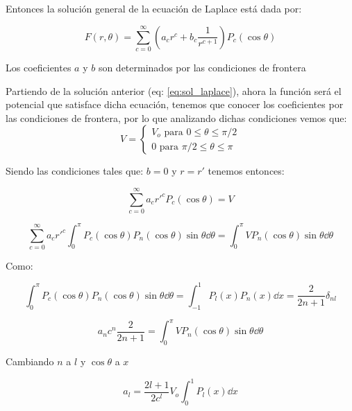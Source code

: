 \documentclass[11pt]{report}
\theoremstyle{plain}
\theoremstyle{definition}
\begin{document}
Entonces la solución general de la ecuación de Laplace está dada por:

\begin{equation}
	\label{eq:sol_laplace}
	F(r,\theta)=\sum^\infty_{c=0}\left(a_c r^c + b_c \frac{1}{r^{c+1}}\right)P_c(\cos\theta)
\end{equation}

Los coeficientes $a$ y $b$ son determinados por las condiciones de frontera


Partiendo de la solución anterior (eq: \ref{eq:sol_laplace}), ahora la función será el potencial que satisface dicha ecuación, tenemos que conocer los coeficientes por las condiciones de frontera, por lo que analizando dichas condiciones vemos que:
\begin{equation*}
	V=
	\begin{cases}
		V_o \text{ para } 0\leq\theta\leq\pi/2\\
		0 \text{ para } \pi/2\leq\theta\leq\pi
	\end{cases}
\end{equation*}

Siendo las condiciones tales que: $b=0$ y $r=r'$ tenemos entonces:

\begin{equation*}
	\sum^\infty_{c=0} a_c r'^c P_c(\cos\theta) = V
\end{equation*}



\begin{equation*}
	\sum^\infty_{c=0} a_c r'^c \int^\pi_0  P_c(\cos\theta) P_n(\cos\theta)\sin\theta \dd{\theta} = \int^\pi_0 VP_n(\cos\theta)\sin\theta\dd{\theta}
\end{equation*}

Como:

\begin{equation*}
	\int^\pi_0  P_c(\cos\theta) P_n(\cos\theta)\sin\theta \dd{\theta} = \int^1_{-1}P_l(x)P_n(x)\dd{x}=\frac{2}{2n+1}\delta_{nl}
\end{equation*}

\begin{equation*}
	a_nc^n\frac{2}{2n+1}=\int^\pi_0 VP_n(\cos\theta)\sin\theta\dd{\theta}
\end{equation*}

Cambiando $n$ a $l$ y $\cos\theta$ a $x$

\begin{equation*}
	a_l = \frac{2l+1}{2c^l}V_o\int^1_0P_l(x)\dd{x}
\end{equation*}
\end{document}
